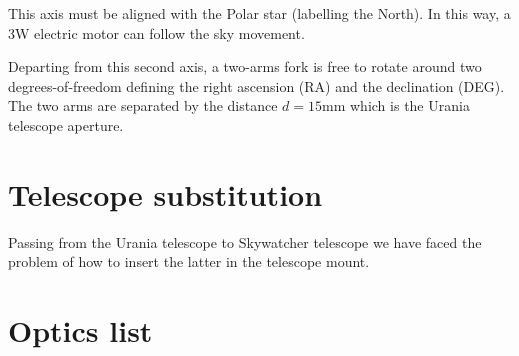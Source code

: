 \documentclass{article}
\begin{document}
\begin{multicols}{2}
        This axis must be aligned with the Polar star (labelling the North).
        In this way, a 3W electric motor can follow the sky movement.

        Departing from this second axis, a two-arms fork is free to rotate around two degrees-of-freedom defining the right ascension (RA) and the declination (DEG).
        The two arms are separated by the distance \(d = 15\)mm which is the Urania telescope aperture.

        \section{Telescope substitution}
        Passing from the Urania telescope to Skywatcher telescope we have faced the problem of how to insert the latter in the telescope mount.



        \section{Optics list}

    \end{multicols}
\end{document}
